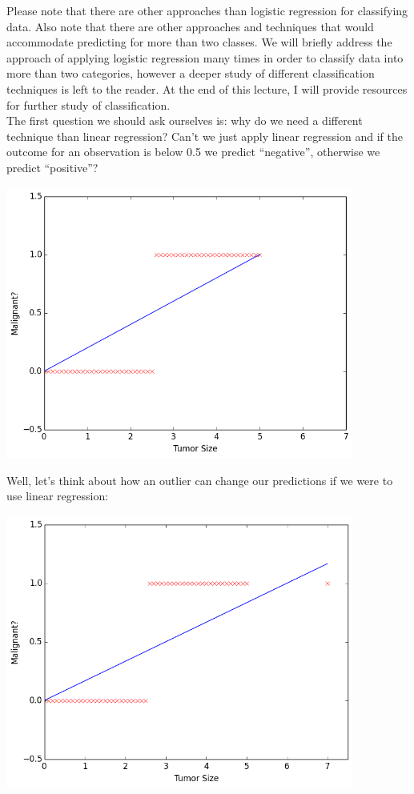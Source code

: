 \documentclass[11pt,a4paper,oneside]{report}
\begin{document}
Please note that there are other approaches than logistic regression for classifying data. Also note that there are other approaches and techniques that would accommodate predicting for more than two classes. We will briefly address the approach of applying logistic regression many times in order to classify data into more than two categories, however a deeper study of different classification techniques is left to the reader. At the end of this lecture, I will provide resources for further study of classification.\\

The first question we should ask ourselves is: why do we need a different technique than linear regression? Can't we just apply linear regression and if the outcome for an observation is below 0.5 we predict ``negative'', otherwise we predict ``positive''? \\

\begin{center}
\includegraphics[width=4.5in]{logregexample.png}\\
\end{center}
\newpage

Well, let's think about how an outlier can change our predictions if we were to use linear regression:\\

\begin{center}
\includegraphics[width=4.5in]{logregexample2.png}\\
\end{center}
\end{document}
